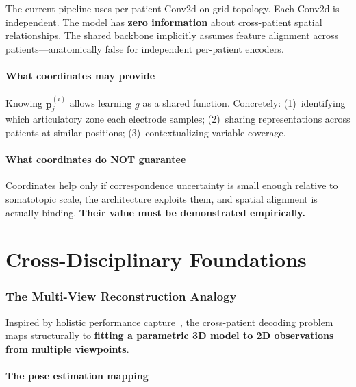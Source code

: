 \documentclass[11pt,letterpaper]{article}
\newcommand{\bfp}{\mathbf{p}}
\begin{document}
The current pipeline uses per-patient Conv2d on grid topology. Each Conv2d is independent. The model has \textbf{zero information} about cross-patient spatial relationships. The shared backbone implicitly assumes feature alignment across patients---anatomically false for independent per-patient encoders.

\subsection{What coordinates may provide}

Knowing $\bfp_j^{(i)}$ allows learning $g$ as a shared function. Concretely: (1)~identifying which articulatory zone each electrode samples; (2)~sharing representations across patients at similar positions; (3)~contextualizing variable coverage.

\subsection{What coordinates do NOT guarantee}

Coordinates help only if correspondence uncertainty is small enough relative to somatotopic scale, the architecture exploits them, and spatial alignment is actually binding. \textbf{Their value must be demonstrated empirically.}



\part{Cross-Disciplinary Foundations}

\section{The Multi-View Reconstruction Analogy}\label{sec:analogy}

Inspired by holistic performance capture~\cite{wang2025}, the cross-patient decoding problem maps structurally to \textbf{fitting a parametric 3D model to 2D observations from multiple viewpoints}.

\subsection{The pose estimation mapping}
\end{document}
